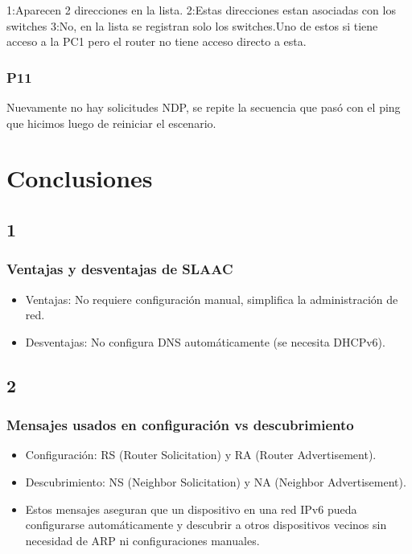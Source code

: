 \documentclass[]{article}
\begin{document}
	1:Aparecen 2 direcciones en la lista.
	2:Estas direcciones estan asociadas con los switches
	3:No, en la lista se registran solo los switches.Uno de estos si tiene acceso a la PC1 pero el router no tiene acceso directo a esta.
	
	\subsubsection{\textbf{P11}}
	
	Nuevamente no hay solicitudes NDP, se repite la secuencia que pasó con el ping que hicimos luego de reiniciar el escenario. 
	
	
	\section{\textbf{Conclusiones}}
	
	
	\subsection{\textbf{1}}
	
	\subsubsection{\textbf{Ventajas y desventajas de SLAAC}}
	
	\begin{itemize}
		\item Ventajas: No requiere configuración manual, simplifica la administración de red.
		\item Desventajas: No configura DNS automáticamente (se necesita DHCPv6).
	\end{itemize}
	
	\subsection{\textbf{2}}
	
	\subsubsection{\textbf{Mensajes usados en configuración vs descubrimiento}}
	
	\begin{itemize}
		\item Configuración: RS (Router Solicitation) y RA (Router Advertisement).
		\item Descubrimiento: NS (Neighbor Solicitation) y NA (Neighbor Advertisement).
		\item Estos mensajes aseguran que un dispositivo en una red IPv6 pueda configurarse automáticamente y descubrir a otros dispositivos vecinos sin necesidad de ARP ni configuraciones manuales.
	\end{itemize}
\end{document}
